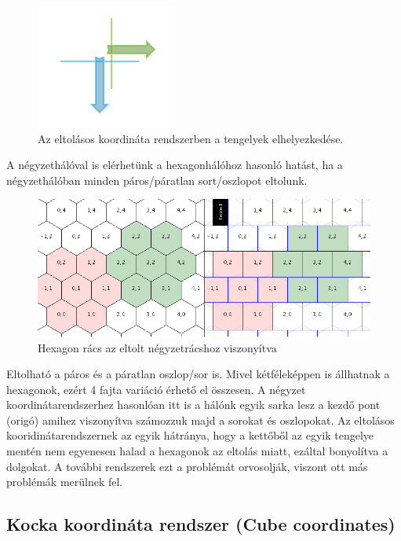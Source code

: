 \begin{figure}[h]
\centering
\includegraphics[scale=0.5]{kepek/img41.png}
\caption{Az eltolásos koordináta rendszerben a tengelyek elhelyezkedése.}
\label{fig:img41}
\end{figure}

\noindent A négyzethálóval is elérhetünk a hexagonhálóhoz hasonló hatást, ha a négyzethálóban minden páros/páratlan sort/oszlopot eltolunk.

\begin{figure}[h]
\centering
\includegraphics[scale=0.5]{kepek/img42.png}
\caption{Hexagon rács az eltolt négyzetrácshoz viszonyítva}
\label{fig:img42}
\end{figure}

Eltolható a páros és a páratlan oszlop/sor is. Mivel kétféleképpen is állhatnak a hexagonok, ezért 4 fajta variáció érhető el összesen.
\newline
\newline A négyzet koordinátarendszerhez hasonlóan itt is a hálónk egyik sarka lesz a kezdő pont (origó) amihez viszonyítva számozzuk majd a sorokat és oszlopokat.
\newline
\newline Az eltolásos kooridinátarendszernek az egyik hátránya, hogy a kettőből az egyik tengelye mentén nem egyenesen halad a hexagonok az eltolás miatt, ezáltal bonyolítva a dolgokat. A további rendszerek ezt a problémát orvosolják, viszont ott más problémák merülnek fel.		

\subsection{Kocka koordináta rendszer (Cube coordinates)}

